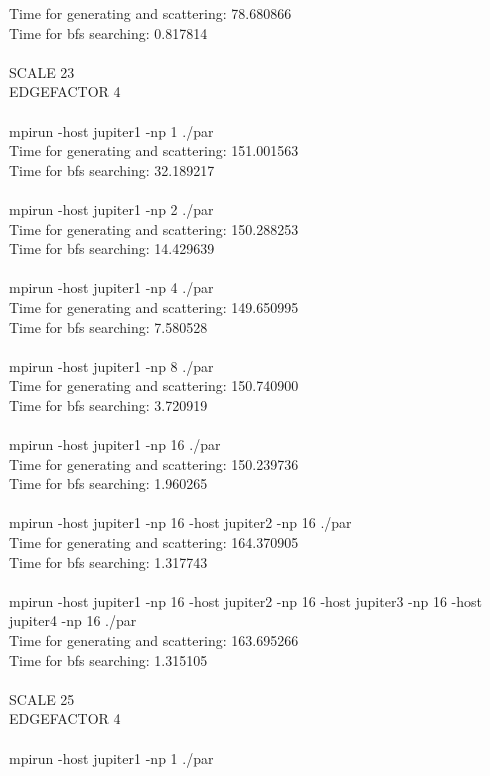 \documentclass[12pt,a4paper]{article}
\begin{document}
Time for generating and scattering: 78.680866\\
Time for bfs searching: 0.817814\\
\\
SCALE 23\\
EDGEFACTOR 4\\
\\
mpirun -host jupiter1 -np 1 ./par\\
Time for generating and scattering: 151.001563\\
Time for bfs searching: 32.189217\\
\\
mpirun -host jupiter1 -np 2 ./par\\
Time for generating and scattering: 150.288253\\
Time for bfs searching: 14.429639\\
\\
mpirun -host jupiter1 -np 4 ./par\\
Time for generating and scattering: 149.650995\\
Time for bfs searching: 7.580528\\
\\
mpirun -host jupiter1 -np 8 ./par\\
Time for generating and scattering: 150.740900\\
Time for bfs searching: 3.720919\\
\\
mpirun -host jupiter1 -np 16 ./par\\
Time for generating and scattering: 150.239736\\
Time for bfs searching: 1.960265\\
\\
mpirun -host jupiter1 -np 16 -host jupiter2 -np 16 ./par\\
Time for generating and scattering: 164.370905\\
Time for bfs searching: 1.317743\\
\\
mpirun -host jupiter1 -np 16 -host jupiter2 -np 16 -host jupiter3 -np 16 -host jupiter4 -np 16 ./par\\
Time for generating and scattering: 163.695266\\
Time for bfs searching: 1.315105\\
\\
SCALE 25\\
EDGEFACTOR 4\\
\\
mpirun -host jupiter1 -np 1 ./par\\
\end{document}
